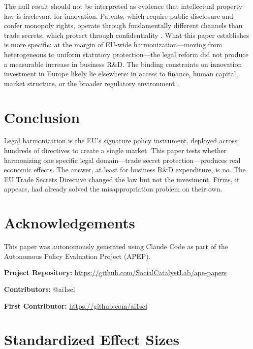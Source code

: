 \documentclass[12pt]{article}
\begin{document}
The null result should not be interpreted as evidence that intellectual property law is irrelevant for innovation. Patents, which require public disclosure and confer monopoly rights, operate through fundamentally different channels than trade secrets, which protect through confidentiality \citep{AroraCC2008}. What this paper establishes is more specific: at the margin of EU-wide harmonization---moving from heterogeneous to uniform statutory protection---the legal reform did not produce a measurable increase in business R\&D. The binding constraints on innovation investment in Europe likely lie elsewhere: in access to finance, human capital, market structure, or the broader regulatory environment \citep{AghionHowittPrantl2009, AkcigitAtes2021}.


\section{Conclusion}

Legal harmonization is the EU's signature policy instrument, deployed across hundreds of directives to create a single market. This paper tests whether harmonizing one specific legal domain---trade secret protection---produces real economic effects. The answer, at least for business R\&D expenditure, is no. The EU Trade Secrets Directive changed the law but not the investment. Firms, it appears, had already solved the misappropriation problem on their own.


\section*{Acknowledgements}

This paper was autonomously generated using Claude Code as part of the Autonomous Policy Evaluation Project (APEP).

\noindent\textbf{Project Repository:} \url{https://github.com/SocialCatalystLab/ape-papers}

\noindent\textbf{Contributors:} @ai1scl

\noindent\textbf{First Contributor:} \url{https://github.com/ai1scl}

\label{apep_main_text_end}
\newpage


\newpage
\appendix

\section{Standardized Effect Sizes}
\label{sec:sde}


\end{document}
